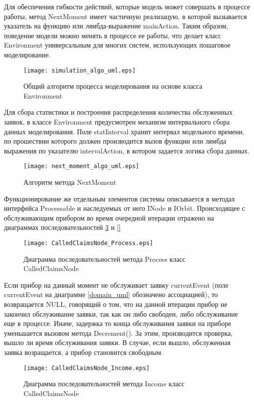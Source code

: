 Для обеспечения гибкости действий, которые модель может совершать в процессе работы, метод NextMoment имеет частичную реализацую, в которой вызывается указатель на функцию или лямбда-выражение mainAction. Таким образом, поведение модели можно менять в процессе ее работы, что делает класс Environment универсальным для многих систем, использующих пошаговое моделирование.
\begin{figure}[H]
	\centering
	\texttt{[image: simulation\_algo\_uml.eps]}
	\caption{Общий алгоритм процесса моделирования на основе класса Environment}
	\label{simulation_algo_uml}
\end{figure}

Для сбора статистики и построения распределения количества обслуженных заявок, в классе Environment предусмотрен механизм интервального сбора данных моделирования. Поле statInterval хранит интервал модельного времени, по прошествии которого должен производится вызов функции или лямбда выражения по указателю intervalAction, в котором задается логика сбора данных.
\begin{figure}[H]
	\centering
	\texttt{[image: next\_moment\_algo\_uml.eps]}
	\caption{Алгоритм метода NextMoment}
	\label{next_moment_algo_uml}
\end{figure}
Функционирование же отдельным элементов системы описывается в методах интерфейса Processable и наследуемых от него INode и IOrbit.
Происходящее с обслуживающим прибором во время очередной итерации отражено на диаграммах последовательностей \ref{CalledClaimsNode_Process_uml} и \ref{}
\begin{figure}[H]
	\centering
	\texttt{[image: CalledClaimsNode\_Process.eps]}
	\caption{Диаграмма последовательностей метода Process класс CalledClaimsNode}
	\label{CalledClaimsNode_Process_uml}
\end{figure}
Если прибор на данный момент не обслуживает заявку currentEvent (поле currentEvent на диаграмме \ref{domain_uml} обозначено ассоциацией), то возвращается NULL, говорящий о том, что на данной итерации прибор не закончил обслуживание заявки, так как он либо свободен, либо обслуживание еще в процессе. Иначе, задержка то конца обслуживания заявки на приборе уменьшается вызовом метода Decrement(). За этим, производится проверка, вышло ли время обслуживания заявки. В случае, если вышло, обслуженная заявка возращается, а прибор становится свободным.
\begin{figure}[H]
	\centering
	\texttt{[image: CalledClaimsNode\_Income.eps]}
	\caption{Диаграмма последовательностей метода Income класс CalledClaimsNode}
	\label{CalledClaimsNode_Income_uml}
\end{figure}